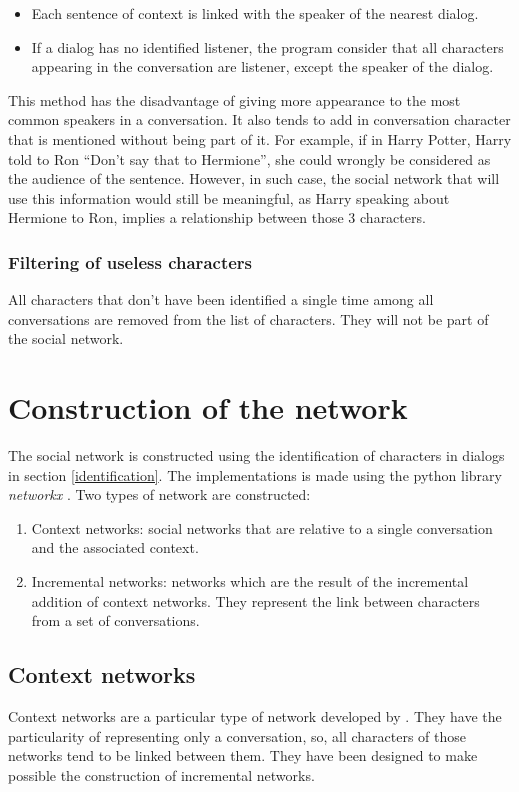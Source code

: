 \documentclass[a4paper, 12pt]{report}
\begin{document}
\begin{itemize}
\item Each sentence of context is linked with the speaker of the nearest dialog.

\item If a dialog has no identified listener, the program consider that all characters appearing in the conversation are listener, except the speaker of the dialog.
\end{itemize}
This method has the disadvantage of giving more appearance to the most common speakers in a conversation. It also tends to add in conversation character that is mentioned without being part of it. For example, if in Harry Potter, Harry told to Ron ``Don't say that to Hermione'', she could wrongly be considered as the audience of the sentence. However, in such case, the social network that will use this information would still be meaningful, as Harry speaking about Hermione to Ron, implies a relationship between those 3 characters.


\subsubsection{Filtering of useless characters}
All characters that don't have been identified a single time among all conversations are removed from the list of characters. They will not be part of the social network.



\section{Construction of the network}
The social network is constructed using the identification of characters in dialogs in section \ref{identification}. The implementations is made using the python library \textit{networkx} \citep{networkx}.
Two types of network are constructed:
\begin{enumerate}
\item Context networks: social networks that are relative to a single conversation and the associated context.
\item Incremental networks: networks which are the result of the incremental addition of context networks. They represent the link between characters from a set of conversations.
\end{enumerate}
\subsection{Context networks}
Context networks are a particular type of network developed by \cite{original}. They have the particularity of representing only a conversation, so, all characters of those networks tend to be linked between them. They have been designed to make possible the construction of incremental networks. \\
\end{document}
